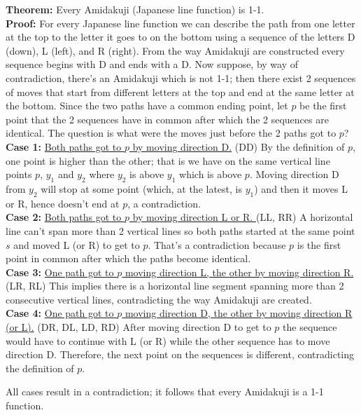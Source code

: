 \documentclass[12pt]{article}%
\begin{document}
\noindent\textbf{Theorem:} Every Amidakuji (Japanese 
line function) is 1-1.\\
\textbf{Proof:} For every Japanese line function we can 
describe the path from one letter at the top to the letter it 
goes to on the bottom using a sequence of the letters D 
(down), L (left), and R (right). From the way Amidakuji
are constructed every sequence begins with D and ends 
with a D. Now suppose, by way of contradiction, there's 
an Amidakuji which is not 1-1; then there exist 2 sequences
of moves that start from different letters at the
top and end at the same letter at the bottom. Since the
two paths have a common ending point, let $p$ be
the first point that the 2 sequences have in common 
after which the 2 sequences are identical. The question
is what were the moves just before the 2 paths  got to $p$?\\
\textbf{Case 1:} \underline{Both paths got to $p$ by 
moving direction D.} (DD) By the definition of $p$, one point 
is higher than the other; that is we have on the same 
vertical line points $p$, $y_1$ and $y_2$ where $y_2$ is 
above $y_1$ which is above $p$. Moving direction D from 
$y_2$ will stop at some point (which, at the latest, is 
$y_1$) and then it moves L or R, hence doesn't end at $p$,
a contradiction.\\
\textbf{Case 2:} \underline{Both paths got to $p$ by 
moving direction L or R. } (LL, RR) A horizontal line 
can't span more than 2 vertical lines so both paths started 
at the same point $s$ and moved L (or R) to get to $p$. 
That's a contradiction because $p$ is the first point in 
common after which the paths become identical.\\
\textbf{Case 3:} \underline{One path got to $p$
moving direction L, the other by moving
direction R.} (LR, RL) This implies there is a horizontal
line segment spanning more than 2 consecutive vertical
lines, contradicting the way Amidakuji are created.\\
\textbf{Case 4:} \underline{One path got to $p$ moving 
direction D, the other by moving direction R (or L).} (DR, DL, 
LD, RD) After moving direction D to get to $p$ the sequence
would have to continue with L (or R) while the other 
sequence has to move direction D. Therefore, the next 
point on the sequences is different, contradicting 
the definition of $p$.

All cases result in a contradiction; it follows that every 
Amidakuji is a 1-1 function.
\end{document}
